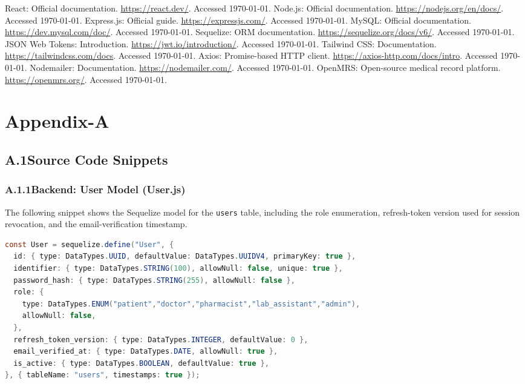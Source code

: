 \documentclass[12pt,a4paper]{report}
\begin{document}
\begin{thebibliography}{99}
 React: Official documentation. \url{https://react.dev/}. Accessed \today.
 Node.js: Official documentation. \url{https://nodejs.org/en/docs/}. Accessed \today.
 Express.js: Official guide. \url{https://expressjs.com/}. Accessed \today.
 MySQL: Official documentation. \url{https://dev.mysql.com/doc/}. Accessed \today.
 Sequelize: ORM documentation. \url{https://sequelize.org/docs/v6/}. Accessed \today.
 JSON Web Tokens: Introduction. \url{https://jwt.io/introduction/}. Accessed \today.
 Tailwind CSS: Documentation. \url{https://tailwindcss.com/docs}. Accessed \today.
 Axios: Promise-based HTTP client. \url{https://axios-http.com/docs/intro}. Accessed \today.
 Nodemailer: Documentation. \url{https://nodemailer.com/}. Accessed \today.
 OpenMRS: Open-source medical record platform. \url{https://openmrs.org/}. Accessed \today.
\end{thebibliography}

\appendix
\chapter*{Appendix-A}

\section*{A.1\quad Source Code Snippets}

\subsection*{A.1.1\quad Backend: User Model (User.js)}
The following snippet shows the Sequelize model for the \texttt{users} table, including
the role enumeration, refresh-token version used for session revocation, and the
email-verification timestamp.
\begin{lstlisting}[language=Java]
const User = sequelize.define("User", {
  id: { type: DataTypes.UUID, defaultValue: DataTypes.UUIDV4, primaryKey: true },
  identifier: { type: DataTypes.STRING(100), allowNull: false, unique: true },
  password_hash: { type: DataTypes.STRING(255), allowNull: false },
  role: {
    type: DataTypes.ENUM("patient","doctor","pharmacist","lab_assistant","admin"),
    allowNull: false,
  },
  refresh_token_version: { type: DataTypes.INTEGER, defaultValue: 0 },
  email_verified_at: { type: DataTypes.DATE, allowNull: true },
  is_active: { type: DataTypes.BOOLEAN, defaultValue: true },
}, { tableName: "users", timestamps: true });
\end{lstlisting}
\end{document}
